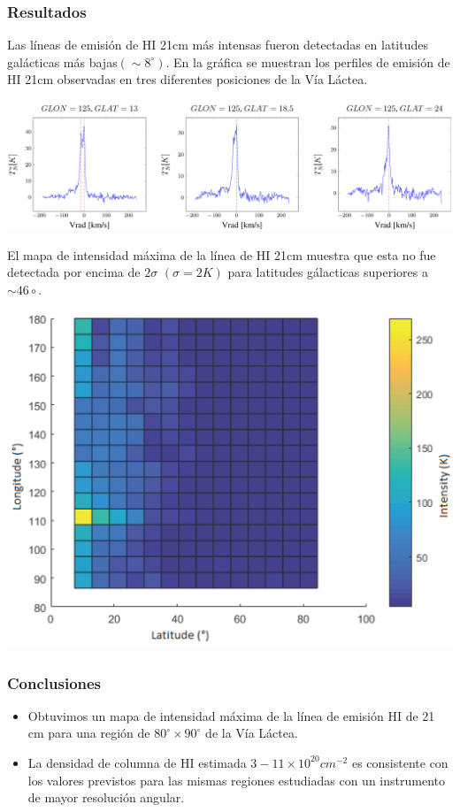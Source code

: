 \documentclass[8pt]{beamer}
\begin{document}
\begin{frame}
\frametitle{Resultados}
Las líneas de emisión de HI 21cm más intensas fueron detectadas en latitudes galácticas más bajas$(\sim 8^\circ)$. En la gráfica se muestran los perfiles de emisión de HI 21cm observadas en tres diferentes posiciones de la Vía Láctea.
\begin{center}
\includegraphics[width=0.7\linewidth]{figures/halo2.png}
\end{center}
El mapa de intensidad máxima de la línea de HI 21cm muestra que esta no fue detectada por encima de $2\sigma$ $(\sigma=2K)$ para latitudes gálacticas superiores a $\sim 46\circ$.
\begin{center}
\includegraphics[width=0.4\linewidth]{figures/milky2.png}
\end{center}
\end{frame}
\begin{frame}
\frametitle{Conclusiones}
\begin{itemize}
  \item Obtuvimos un mapa de intensidad máxima de la línea de emisión HI de 21 cm para una región de $80^\circ \times 90^\circ$ de la Vía Láctea.
\item La densidad de columna de HI estimada $3-11\times10^{20}cm^{-2}$ es consistente con los valores previstos para las mismas regiones estudiadas con un instrumento de mayor resolución angular. 
\end{itemize}
\end{frame}
\end{document}
